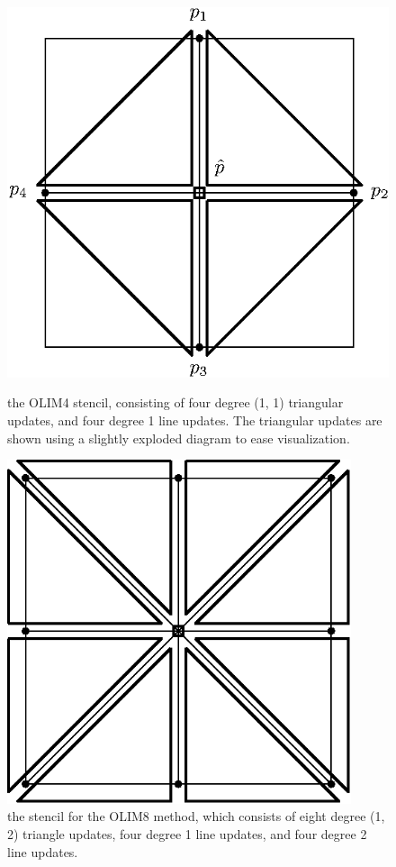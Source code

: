 \documentclass[eikonal.tex]{subfiles}
\begin{document}
\begin{figure}
  \centering
  \begin{minipage}[c]{0.47\textwidth}
    \centering
    \includegraphics[width=\textwidth]{olim4-stencil.eps}
    \caption{the OLIM4 stencil, consisting of four degree (1, 1)
      triangular updates, and four degree 1 line updates. The
      triangular updates are shown using a slightly exploded diagram
      to ease visualization.}\label{fig:olim4-stencil}
  \end{minipage}
  \hfill
  \begin{minipage}[c]{0.47\textwidth}
    \centering
    \includegraphics[width=0.9\textwidth]{olim8-stencil.eps}
    \caption{the stencil for the OLIM8 method, which consists of eight
      degree (1, 2) triangle updates, four degree 1 line updates, and
      four degree 2 line updates.}\label{fig:olim8-stencil}
  \end{minipage}
\end{figure}
\end{document}
